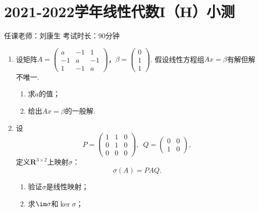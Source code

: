 \section{2021-2022学年线性代数I（H）小测}

\begin{center}
    任课老师：刘康生\hspace{4em} 考试时长：90分钟
\end{center}
\begin{enumerate}
    \item  设矩阵$A=\begin{pmatrix}
        a & -1 & 1 \\ -1 & a & -1 \\ 1 & -1 & a
    \end{pmatrix}$，$\beta=\begin{pmatrix}
        0 \\ 1 \\ 1
    \end{pmatrix}$. 假设线性方程组$Ax=\beta$有解但解不唯一.
    \begin{enumerate}
        \item 求$a$的值；

        \item 给出$Ax=\beta$的一般解.
    \end{enumerate}
	\item 设
	\[P=\begin{pmatrix}
        1 & 1 & 0 \\ 0 & 1 & 0 \\ 0 & 0 & 0
    \end{pmatrix},\enspace Q=\begin{pmatrix}
        0 & 0 \\ 1 & 0
    \end{pmatrix},\]
    定义$\mathbf{R}^{3\times 2}$上映射$\sigma$：
    \[\sigma(A)=PAQ.\]
    \begin{enumerate}
        \item 验证$\sigma$是线性映射；

        \item 求$\im\sigma$和$\ker\sigma$；


\end{enumerate}
\end{enumerate}

